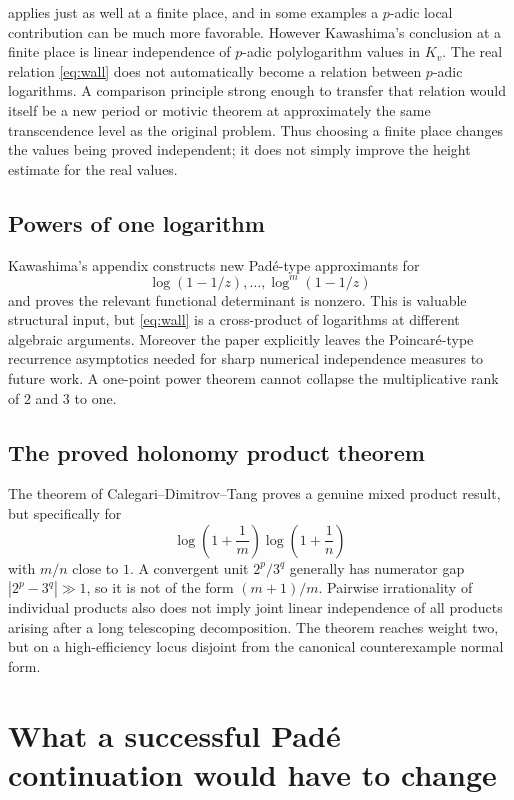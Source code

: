 \documentclass[11pt]{article}
\theoremstyle{definition}
\begin{document}
 applies just as well at a finite place, and in some examples a
$p$-adic local contribution can be much more favorable.  However Kawashima's conclusion at a
finite place is linear independence of $p$-adic polylogarithm values in $K_v$.  The real
relation \eqref{eq:wall} does not automatically become a relation between $p$-adic logarithms.
A comparison principle strong enough to transfer that relation would itself be a new period
or motivic theorem at approximately the same transcendence level as the original problem.
Thus choosing a finite place changes the values being proved independent; it does not simply
improve the height estimate for the real values.

\subsection{Powers of one logarithm}

Kawashima's appendix constructs new Pad\'e-type approximants for
\[
 \log(1-1/z),\ldots,\log^m(1-1/z)
\]
and proves the relevant functional determinant is nonzero.  This is valuable structural
input, but \eqref{eq:wall} is a cross-product of logarithms at different algebraic arguments.
Moreover the paper explicitly leaves the Poincar\'e-type recurrence asymptotics needed for
sharp numerical independence measures to future work.  A one-point power theorem cannot
collapse the multiplicative rank of $2$ and $3$ to one.

\subsection{The proved holonomy product theorem}

The theorem of Calegari--Dimitrov--Tang proves a genuine mixed product result, but specifically
for
\[
 \log\!\left(1+\frac1m\right)\log\!\left(1+\frac1n\right)
\]
with $m/n$ close to $1$.  A convergent unit $2^p/3^q$ generally has numerator gap
$|2^p-3^q|\gg1$, so it is not of the form $(m+1)/m$.  Pairwise irrationality of individual
products also does not imply joint linear independence of all products arising after a long
telescoping decomposition.  The theorem reaches weight two, but on a high-efficiency locus
disjoint from the canonical counterexample normal form.

\section{What a successful Pad\'e continuation would have to change}
\end{document}
